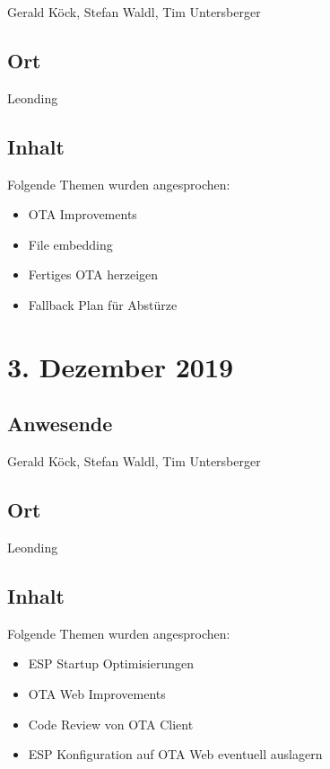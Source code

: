 Gerald Köck, Stefan Waldl, Tim Untersberger

\subsection*{Ort}

Leonding

\subsection*{Inhalt}

Folgende Themen wurden angesprochen:

\begin{itemize}
  \item OTA Improvements
  \item File embedding
  \item Fertiges OTA herzeigen
  \item Fallback Plan für Abstürze
\end{itemize}

\pagebreak

\section*{3. Dezember 2019}

\subsection*{Anwesende}

Gerald Köck, Stefan Waldl, Tim Untersberger

\subsection*{Ort}

Leonding

\subsection*{Inhalt}

Folgende Themen wurden angesprochen:

\begin{itemize}
  \item ESP Startup Optimisierungen
  \item OTA Web Improvements
  \item Code Review von OTA Client
  \item ESP Konfiguration auf OTA Web eventuell auslagern
\end{itemize}

